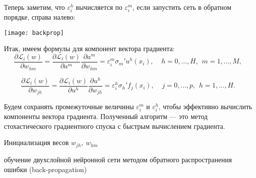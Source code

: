 \documentclass[specialist, 12pt, 
subf, %
href, colorlinks=true,
substylefile = spbu.rtx,
]{disser}
\begin{document}
Теперь заметим, что $\varepsilon_i^h$ вычисляется по $\varepsilon_i^m$, если запустить сеть в обратном порядке, справа налево:

	\begin{center}
	\begin{minipage}{0.51\linewidth}
		\centering
		\texttt{[image: backprop]}
	\end{minipage}
\end{center}

Итак, имеем формулы для компонент вектора градиента:
\begin{equation*}
\frac{\partial \mathcal{L}_i(w)}{\partial w_{hm}} = \frac{\partial \mathcal{L}_i(w)}{\partial a^m} \frac{\partial a^m}{\partial w_{hm}} =   \varepsilon^m_i \sigma_m' u^h(x_i), ~~~~~ h=0,\ldots,H, ~~ m=1,\ldots,M,
\end{equation*}

\begin{equation*}
\frac{\partial \mathcal{L}_i(w)}{\partial w_{jh}} = \frac{\partial \mathcal{L}_i(w)}{\partial u^h} \frac{\partial u^h}{\partial w_{jh}} =   \varepsilon^h_i \sigma_h' f_j(x_i), ~~~~~ j=0,\ldots,p, ~~ h=1,\ldots,H.
\end{equation*}

Будем сохранять промежуточные величины $\varepsilon_i^m$ и $\varepsilon_i^h$, чтобы эффективно вычислить компоненты вектора градиента. Полученный алгоритм --- это метод стохастического градиентного спуска с быстрым вычислением градиента. \\

\begin{algorithm}[H]
	\SetAlgoLined
	
	Инициализация весов $w_{jh},~ w_{hm}$\;
	\caption{обучение двухслойной нейронной сети методом обратного распространения ошибки (back-propagation)}
\end{algorithm}
~~~\\
~~~\\
~~~ \\
\end{document}
